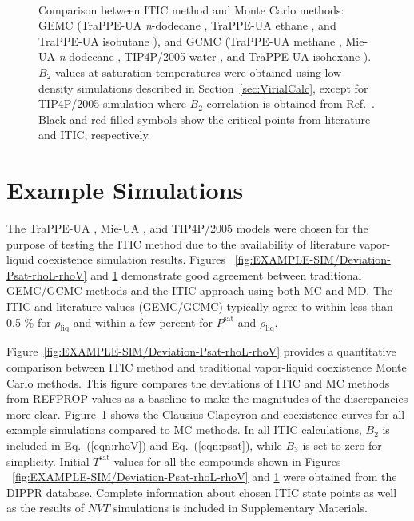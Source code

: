 \documentclass[5p,times]{elsarticle}
\begin{document}
\begin{figure}[]
\centering
{}\label{aa}
\label{bb}\\
\label{cc}
\label{dd}
\caption{
Comparison between ITIC method and Monte Carlo methods: GEMC (TraPPE-UA \textit{n}-dodecane \cite{Martin1998}, TraPPE-UA ethane \cite{Martin1998}, and TraPPE-UA isobutane \cite{trappe-isobutane-validation}), and GCMC (TraPPE-UA methane \cite{Shen2008}, Mie-UA \textit{n}-dodecane \cite{Potoff2009}, TIP4P/2005 water \cite{Shen2008}, and TraPPE-UA isohexane \cite{Mick2017}). $B_2$ values at saturation temperatures were obtained using low density simulations described in Section~\ref{sec:VirialCalc}, except for TIP4P/2005 simulation where $B_2$ correlation is obtained from Ref.~\cite{Benjamin2007,Chialvo2006}. Black and red filled symbols show the critical points from literature and ITIC, respectively.
}
\label{fig:EXAMPLE-SIM/all}
\end{figure}

\section{Example Simulations} \label{sec:ExampleSim}
The TraPPE-UA \cite{Martin1998,Martin1999,Wick2000}, Mie-UA \cite{Potoff2009,Mick2017,Barhaghi2017,Mick2015}, and TIP4P/2005 \cite{Abascal2005} models were chosen for the purpose of testing the ITIC method due to the availability of literature vapor-liquid coexistence simulation results. Figures ~\ref{fig:EXAMPLE-SIM/Deviation-Psat-rhoL-rhoV} and \ref{fig:EXAMPLE-SIM/all} demonstrate good agreement between traditional GEMC/GCMC methods and the ITIC approach using both MC and MD. The ITIC and literature values (GEMC/GCMC) typically agree to within less than 0.5 \% for $\rho_\mathrm{liq}$ and within a few percent for $P^\mathrm{sat}$ and $\rho_\mathrm{liq}$.

Figure~\ref{fig:EXAMPLE-SIM/Deviation-Psat-rhoL-rhoV} provides a quantitative comparison between ITIC method and traditional vapor-liquid coexistence Monte Carlo methods. This figure compares the deviations of ITIC and MC methods from REFPROP values as a baseline to make the magnitudes of the discrepancies more clear. Figure~\ref{fig:EXAMPLE-SIM/all} shows the Clausius-Clapeyron and coexistence curves for all example simulations compared to MC methods. In all ITIC calculations, $B_2$ is included in Eq.~(\ref{eqn:rhoV}) and Eq.~(\ref{eqn:psat}), while $B_3$ is set to zero for simplicity. Initial $T^\mathrm{sat}$ values for all the compounds shown in Figures ~\ref{fig:EXAMPLE-SIM/Deviation-Psat-rhoL-rhoV} and \ref{fig:EXAMPLE-SIM/all} were obtained from the DIPPR \cite{DIPPR2004} database. Complete information about chosen ITIC state points as well as the results of $NVT$ simulations is included in Supplementary Materials.
\end{document}
